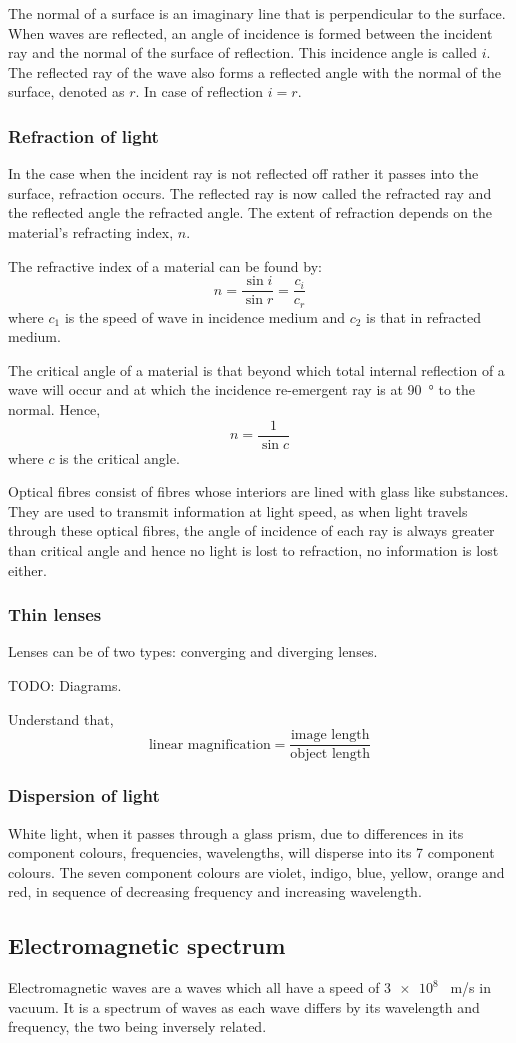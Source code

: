 The normal of a surface is an imaginary line that is perpendicular to the surface. When waves are
reflected, an angle of incidence is formed between the incident ray and the normal of the surface
of reflection. This incidence angle is called $i$. The reflected ray of the wave also forms a
reflected angle with the normal of the surface, denoted as $r$. In case of reflection $i = r$.

\subsubsection{Refraction of light}
In the case when the incident ray is not reflected off rather it passes into the surface, 
refraction occurs. The reflected ray is now called the refracted ray and the reflected angle the
refracted angle. The extent of refraction depends on the material's refracting index, $n$.

The refractive index of a material can be found by:
$$ n = \frac{\sin{i}}{\sin{r}} = \frac{c_i}{c_r} $$
where $c_1$ is the speed of wave in incidence medium and $c_2$ is that in refracted medium.

The critical angle of a material is that beyond which total internal reflection of a wave will
occur and at which the incidence re-emergent ray is at \SI{90}{\degree} to the normal. Hence,
$$ n = \frac{1}{\sin{c}} $$
where $c$ is the critical angle.

Optical fibres consist of fibres whose interiors are lined with glass like substances. They are 
used to transmit information at light speed, as when light travels through these optical fibres,
the angle of incidence of each ray is always greater than critical angle and hence no light is
lost to refraction, no information is lost either.

\subsubsection{Thin lenses}
Lenses can be of two types: converging and diverging lenses.

TODO: Diagrams.

Understand that,
$$ \textrm{linear magnification} = \frac{\textrm{image length}}{\textrm{object length}} $$

\subsubsection{Dispersion of light}
White light, when it passes through a glass prism, due to differences in its component colours,
frequencies, wavelengths, will disperse into its 7 component colours. The seven component colours
are violet, indigo, blue, yellow, orange and red, in sequence of decreasing frequency and 
increasing wavelength.

\subsection{Electromagnetic spectrum}

Electromagnetic waves are a waves which all have a speed of $\num{3e8}$ \SI{}{m/s} in vacuum.
It is a spectrum of waves as each wave differs by its wavelength and frequency, the two being
inversely related.
